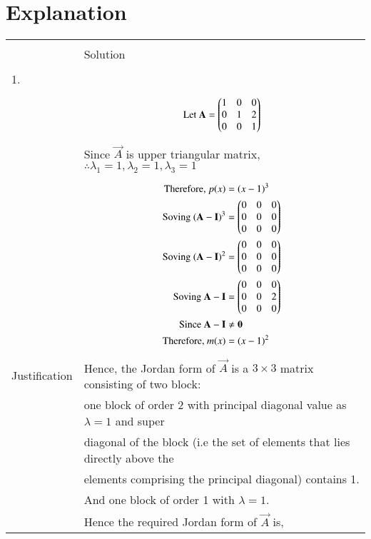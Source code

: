 \documentclass[journal,12pt]{IEEEtran}
\begin{document}
\section{\textbf{Explanation}}
\renewcommand{\thetable}{2}
\begin{longtable}{|l|l|}
\hline
\multirow{3}{*}{} & \\
Statement&Solution\\
\hline
&\\
1.&\\
&\parbox{6cm}{\begin{align*}
    \mbox{Let }\mathbf{A}&=\begin{pmatrix}1&0&0\\0&1&2\\0&0&1\end{pmatrix}\\
\end{align*}}\\
&Since $\vec{A}$ is upper triangular matrix, $\therefore \lambda_{1}=1,\lambda_{2}=1,\lambda_{3}=1$ \\
&\parbox{6cm}{\begin{align*}
    \mbox{Therefore, }p(x)&=(x-1)^3\\
    \mbox{Soving }(\mathbf{A}-\mathbf{I})^3&=\begin{pmatrix}0&0&0\\0&0&0\\0&0&0\end{pmatrix}\\
    \mbox{Soving }(\mathbf{A}-\mathbf{I})^2&=\begin{pmatrix}0&0&0\\0&0&0\\0&0&0\end{pmatrix}\\
    \mbox{Soving }\mathbf{A}-\mathbf{I}&=\begin{pmatrix}0&0&0\\0&0&2\\0&0&0\end{pmatrix}\\
    \mbox{Since }\mathbf{A}-\mathbf{I}&\neq \mathbf{0}\\
    \mbox{Therefore, }m(x)&=(x-1)^2\\
    \end{align*}}\\
Justification&Hence, the Jordan form of $\vec{A}$ is a $3 \times 3$ matrix consisting of two block:\\
&one block of order 2 with principal diagonal value as $\lambda = 1$ and super\\
&diagonal of the block (i.e the set of elements that lies directly above the\\
&elements comprising the principal diagonal) contains 1.\\
&And one block of order 1 with $\lambda=1$.\\
&Hence the required Jordan form of $\vec{A}$ is,\\

\end{longtable}
\end{document}
